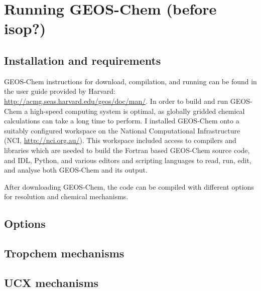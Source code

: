   
    
\section{Running GEOS-Chem (before isop?)}
  \label{Model:GC_running}
  \subsection{Installation and requirements}
    GEOS-Chem instructions for download, compilation, and running can be found in the user guide provided by Harvard: \url{http://acmg.seas.harvard.edu/geos/doc/man/}.
    In order to build and run GEOS-Chem a high-speed computing system is optimal, as globally gridded chemical calculations can take a long time to perform.
    I installed GEOS-Chem onto a suitably configured workspace on the National Computational Infrastructure (NCI, \url{http://nci.org.au/}). 
    This workspace included access to compilers and libraries which are needed to build the Fortran based GEOS-Chem source code, and IDL, Python, and various editors and scripting languages to read, run, edit, and analyse both GEOS-Chem and its output.
      
    After downloading GEOS-Chem, the code can be compiled with different options for resolution and chemical mechanisms.
  \subsection{Options}
    
  \subsection{Tropchem mechanisms}
    
  \subsection{UCX mechanisms}
    
